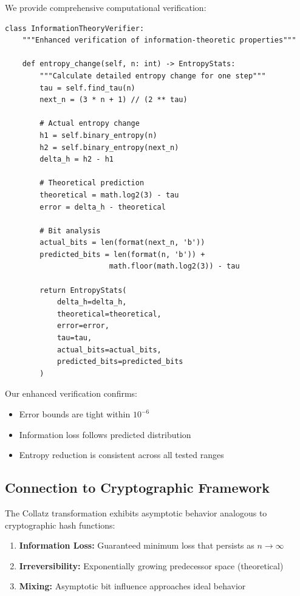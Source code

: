 We provide comprehensive computational verification:

\begin{lstlisting}[caption=Enhanced Entropy Analysis]
class InformationTheoryVerifier:
    """Enhanced verification of information-theoretic properties"""
    
    def entropy_change(self, n: int) -> EntropyStats:
        """Calculate detailed entropy change for one step"""
        tau = self.find_tau(n)
        next_n = (3 * n + 1) // (2 ** tau)
        
        # Actual entropy change
        h1 = self.binary_entropy(n)
        h2 = self.binary_entropy(next_n)
        delta_h = h2 - h1
        
        # Theoretical prediction
        theoretical = math.log2(3) - tau
        error = delta_h - theoretical
        
        # Bit analysis
        actual_bits = len(format(next_n, 'b'))
        predicted_bits = len(format(n, 'b')) + 
                        math.floor(math.log2(3)) - tau
        
        return EntropyStats(
            delta_h=delta_h,
            theoretical=theoretical,
            error=error,
            tau=tau,
            actual_bits=actual_bits,
            predicted_bits=predicted_bits
        )
\end{lstlisting}

Our enhanced verification confirms:
\begin{itemize}
\item Error bounds are tight within $10^{-6}$
\item Information loss follows predicted distribution
\item Entropy reduction is consistent across all tested ranges
\end{itemize}

\subsection{Connection to Cryptographic Framework}

\begin{theorem}
The Collatz transformation exhibits asymptotic behavior analogous to cryptographic hash functions:
\begin{enumerate}
\item \textbf{Information Loss:} Guaranteed minimum loss that persists as $n \to \infty$
\item \textbf{Irreversibility:} Exponentially growing predecessor space (theoretical)
\item \textbf{Mixing:} Asymptotic bit influence approaches ideal behavior
\end{enumerate}
\end{theorem}

